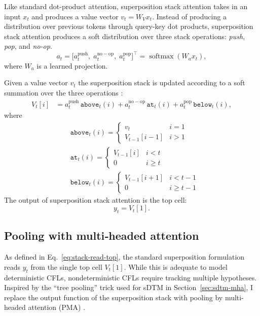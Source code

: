 Like standard dot-product attention, superposition stack attention takes in an input $x_t$ and produces a value vector $v_t=W_Vx_t$. Instead of producing a distribution over previous tokens through query-key dot products, superposition stack attention produces a soft distribution over three stack operations: \textit{push}, \textit{pop}, and \textit{no-op}.
\begin{equation}
  a_t = \bigl[a^{\mathrm{push}}_t,\;a^{\mathrm{no-op}}_t,\;a^{\mathrm{pop}}_t\bigr]^{\top} = \operatorname{softmax}(W_{a}x_{t}),
\end{equation}
where $W_{a}$ is a learned projection.

Given a value vector $v_t$ the superposition stack is updated according to a soft summation over the three operations \citep{joulin2015inferring}:
\begin{align}
 V_t[i] &= a^{\mathrm{push}}_t\,\texttt{above}_{t}(i)
          + a^{\mathrm{no-op}}_t\,\texttt{at}_{t}(i)
          + a^{\mathrm{pop}}_t\,\texttt{below}_{t}(i), \label{eq:stack-update}
\end{align}
where
\begin{align}
  &\texttt{above}_{t}(i)=\begin{cases}v_t & i=1\\V_{t-1}[i-1] & i>1\end{cases}\\
  &\texttt{at}_{t}(i)=\begin{cases}V_{t-1}[i] & i<t\\0 & i \geq t \end{cases}\\
  &\texttt{below}_{t}(i)=\begin{cases}V_{t-1}[i+1] & i<t-1\\ 0 & i\geq t-1\end{cases}
\end{align}
The output of superposition stack attention is the top cell:
\begin{equation}
  y_t = V_t[1]. \label{eq:stack-read-top}
\end{equation}

\subsection{Pooling with multi‑headed attention} \label{sec:stack-pooling}
As defined in Eq.~\ref{eq:stack-read-top}, the standard superposition formulation reads $y_t$ from the single top cell $V_t[1]$. While this is adequate to model deterministic CFLs, nondeterministic CFLs require tracking multiple hypotheses.  Inspired by the ``tree pooling'' trick used for sDTM in Section~\ref{sec:sdtm-mha}, I replace the output function of the superposition stack with pooling by multi-headed attention (PMA) \citep{lee_set_2019}.


